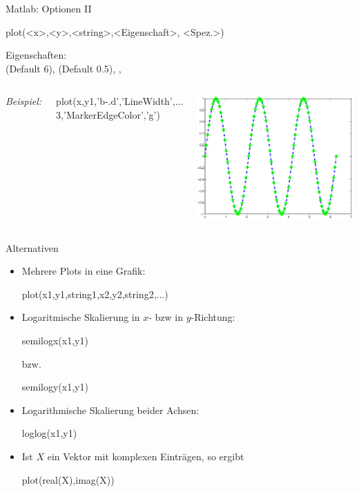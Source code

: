 \documentclass[hyperref={xetex}]{beamer}
\begin{document}
% 
% 
\begin{frame}[fragile]{Matlab: Optionen II}
\begin{matlabin}
plot(<x>,<y>,<string>,<Eigenschaft>, <Spez.>) 
\end{matlabin}
\alert{ Eigenschaften:}\\
 (Default 6),  (Default 0.5),
, \\

\begin{columns}[c]
\textit{Beispiel:} \\
\begin{matlabin}
plot(x,y1,'b-.d','LineWidth',...
3,'MarkerEdgeColor','g')
\end{matlabin}
\includegraphics[width=\textwidth]{figures/grafik_3}
\end{columns}
\end{frame}
% 
% 
\begin{frame}[fragile]{Alternativen}
\begin{itemize}
\item Mehrere Plots in eine Grafik:
\begin{matlabin}
plot(x1,y1,string1,x2,y2,string2,...) 
\end{matlabin}
\item Logaritmische Skalierung in $x$- bzw in $y$-Richtung:
\begin{matlabin}
semilogx(x1,y1) 
\end{matlabin}
  bzw. 
\begin{matlabin}
semilogy(x1,y1) 
\end{matlabin}
\item Logarithmische Skalierung beider Achsen: 
\begin{matlabin}
loglog(x1,y1)
\end{matlabin}
\item Ist $X$ ein Vektor mit komplexen Einträgen, so ergibt \alert{
  } 
\begin{matlabin}
plot(real(X),imag(X))
\end{matlabin}
\end{itemize}
\end{frame}
\end{document}
